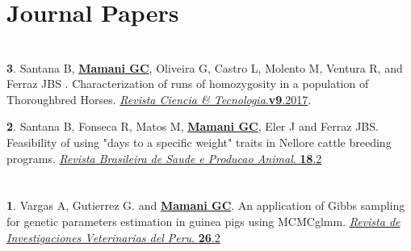 \documentclass[margin,line,10pt]{res}
\newenvironment{list1}{
  \begin{list}{\ding{113}}{%
      \setlength{\itemsep}{0in}
      \setlength{\parsep}{0in} \setlength{\parskip}{0in}
      \setlength{\topsep}{0in} \setlength{\partopsep}{0in} 
      \setlength{\leftmargin}{0.17in}}}{\end{list}}
\begin{document}
\begin{resume}
\begin{list1}
\end{list1}
\vspace{0.5cm}

\vspace{0.5cm}
\section{\sc Journal Papers}

\vspace{0.9cm}

\section{}

\begin{list1}
\item [{\bf 3}.]  Santana B, {\bf \underline{Mamani GC}}, Oliveira G, Castro L, Molento M, Ventura R, and Ferraz JBS .  
     Characterization of runs of homozygosity in a population of Thoroughbred Horses.   
     \textcolor{black}{\href{http://www.citec.fatecjab.edu.br/index.php/files/article/view/1161}{{\it Revista Ciencia & Tecnologia}.{\bf v9}.2017}. } 
     \vspace{0.5cm}
     \item [{\bf 2}.] Santana B, Fonseca R, Matos M, {\bf \underline{Mamani GC}}, Eler J and Ferraz JBS.  
     Feasibility of using "days to a specific weight" traits in Nellore cattle breeding programs.   
     \textcolor{black}{\href{http://www.scielo.br/scielo.php?script=sci_arttext&pid=S1519-99402017000200260}{{\it Revista Brasileira de Saude e Producao Animal}. {\bf 18}.2}}
\end{list1}
\vspace{0.5cm}

\section{}

\begin{list1}
\item [{\bf 1}.]  Vargas A, Gutierrez G. and {\bf \underline{Mamani GC}}.  
 An application of Gibbs sampling for genetic parameters estimation in guinea pigs using MCMCglmm.   
     \textcolor{black}{\href{http://dev.scielo.org.pe/scielo.php?script=sci_arttext&pid=S1609-91172015000200003&lng=en&nrm=iso}{{\it Revista de Investigaciones Veterinarias del Peru}. {\bf 26}.2 } } 
\end{list1}
\vspace{0.5cm}


\end{resume}
\end{document}
